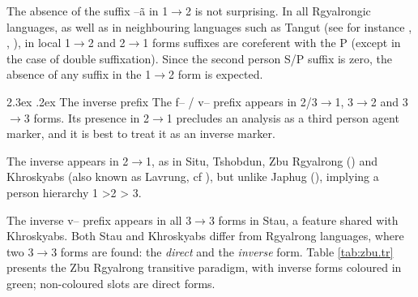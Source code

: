\documentclass[oldfontcommands,twoside,12pt]{memoir}
\makeatletter
\newcommand{\ipa}[1]{{\phon #1}} %
\renewcommand{\subsection}{\@startsection{subsection}{1}{\z@}
                                   {-2.5ex \@plus -1ex \@minus -.2ex}%
                                   {2.3ex \@plus.2ex}%
								{\flushleft\large\itshape} }
\makeatother
\begin{document}
The absence of the suffix  \ipa{--ã}  in 1$\rightarrow$2 is not surprising. In all Rgyalrongic languages, as well as in neighbouring languages such as Tangut (see for instance \citealt[18]{jacques09tangutverb}, \citealt{gongxun14agreement}, \citealt{lai14person}), in local 1$\rightarrow$2 and 2$\rightarrow$1 forms suffixes are coreferent with the P (except in the case of double suffixation). Since the second person S/P suffix is zero, the absence of any suffix in the 1$\rightarrow$2 form is expected.

%
\subsection{The inverse prefix}
The \ipa{f}-- / \ipa{v}-- prefix appears in 2/3$\rightarrow$1, 3$\rightarrow$2 and 3$\rightarrow$3 forms. Its presence  in 2$\rightarrow$1 precludes an analysis as a third person agent marker, and it is best to treat it as an inverse marker.

The inverse appears in 2$\rightarrow$1, as in Situ, Tshobdun, Zbu Rgyalrong (\citealt{delancey81direction, jackson02rentongdengdi, gongxun14agreement}) and Khroskyabs (also known as Lavrung, cf \citealt{lai13affixale}), but unlike Japhug (\citealt{jacques10inverse}), implying a person hierarchy  1 >2 > 3. 



The inverse \ipa{v}-- prefix appears in all 3$\rightarrow$3 forms in Stau, a feature shared with Khroskyabs. Both Stau and Khroskyabs differ from Rgyalrong languages, where two 3$\rightarrow$3 forms are found: the \textit{direct}   and the \textit{inverse} form. Table \ref{tab:zbu.tr} presents the Zbu Rgyalrong transitive paradigm, with inverse forms coloured in green; non-coloured slots are direct forms.
\end{document}

